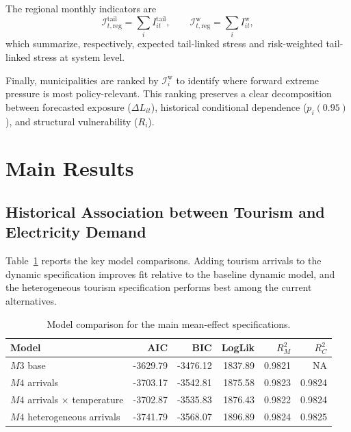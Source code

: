 \documentclass[11pt,a4paper]{article}
\begin{document}
The regional monthly indicators are
\begin{equation}
\label{eq:scenario-regional-aggregation}
\mathcal{I}_{t,\mathrm{reg}}^{\mathrm{tail}} = \sum_i I_{it}^{\mathrm{tail}},
\qquad
\mathcal{I}_{t,\mathrm{reg}}^{\mathrm{w}} = \sum_i I_{it}^{\mathrm{w}},
\end{equation}
which summarize, respectively, expected tail-linked stress and risk-weighted tail-linked stress at system level.

Finally, municipalities are ranked by $\mathcal{I}_{i}^{\mathrm{w}}$ to identify where forward extreme pressure is most policy-relevant. This ranking preserves a clear decomposition between forecasted exposure ($\Delta L_{it}$), historical conditional dependence ($p_i(0.95)$), and structural vulnerability ($R_i$).




\section{Main Results}

\subsection{Historical Association between Tourism and Electricity Demand}

Table~\ref{tab:mean-models} reports the key model comparisons. Adding tourism arrivals to the dynamic specification improves fit relative to the baseline dynamic model, and the heterogeneous tourism specification performs best among the current alternatives.

\begin{table}[H]
\centering
\caption{Model comparison for the main mean-effect specifications.}
\label{tab:mean-models}
\begin{tabular}{lrrrrr}
\toprule
Model & AIC & BIC & LogLik & $R^2_M$ & $R^2_C$ \\
\midrule
$M3$ base & -3629.79 & -3476.12 & 1837.89 & 0.9821 & NA \\
$M4$ arrivals & -3703.17 & -3542.81 & 1875.58 & 0.9823 & 0.9824 \\
$M4$ arrivals $\times$ temperature & -3702.87 & -3535.83 & 1876.43 & 0.9822 & 0.9824 \\
$M4$ heterogeneous arrivals & -3741.79 & -3568.07 & 1896.89 & 0.9824 & 0.9825 \\
\bottomrule
\end{tabular}
\end{table}
\end{document}
